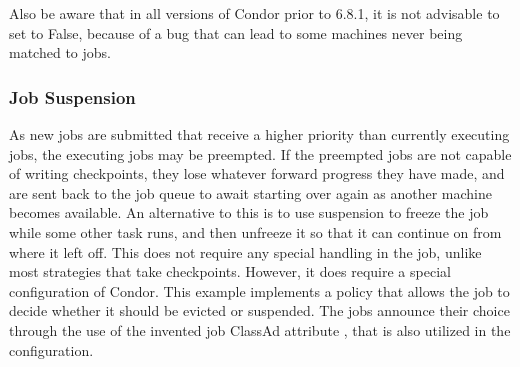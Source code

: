Also be aware that in all versions of Condor prior to 6.8.1, it is
not advisable to set  to False,
because of a bug that can lead to some machines never being
matched to jobs.

\subsubsection{\label{sec:Job-Suspension}Job Suspension}
As new jobs are submitted that receive a higher priority than
currently executing jobs,
the executing jobs may be preempted.
If the preempted jobs are not capable of writing checkpoints,
they lose whatever forward progress they have made,
and are sent back to the job queue to await starting over again as
another machine becomes available.
An alternative to this is to use suspension to freeze the job while some
other task runs,
and then unfreeze it so that it can continue on from where it left off.
This does not require any special handling in the job,
unlike most strategies that take checkpoints.
However, it does require a special configuration of Condor.
This example implements a policy that allows the job to decide
whether it should be evicted or suspended.
The jobs announce their choice through the use of the invented
job ClassAd attribute ,
that is also utilized in the configuration.

